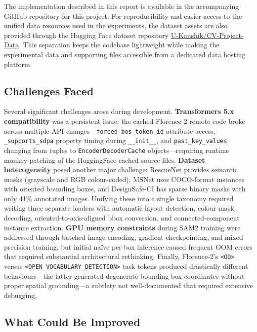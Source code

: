 \documentclass[10pt,a4paper,twocolumn]{article}
\begin{document}
The implementation described in this report is available in the accompanying GitHub repository for this project. For reproducibility and easier access to the unified data resources used in the experiments, the dataset assets are also provided through the Hugging Face dataset repository \href{https://huggingface.co/datasets/U-Kaushik/CV-Project-Data}{U-Kaushik/CV-Project-Data}. This separation keeps the codebase lightweight while making the experimental data and supporting files accessible from a dedicated data hosting platform.

\subsection{Challenges Faced}

Several significant challenges arose during development. \textbf{Transformers 5.x compatibility} was a persistent issue: the cached Florence-2 remote code broke across multiple API changes---\texttt{forced\_bos\_token\_id} attribute access, \texttt{\_supports\_sdpa} property timing during \texttt{\_\_init\_\_}, and \texttt{past\_key\_values} changing from tuples to \texttt{EncoderDecoderCache} objects---requiring runtime monkey-patching of the HuggingFace-cached source files. \textbf{Dataset heterogeneity} posed another major challenge: RescueNet provides semantic masks (grayscale and RGB colour-coded), MSNet uses COCO-format instances with oriented bounding boxes, and DesignSafe-CI has sparse binary masks with only 41\% annotated images. Unifying these into a single taxonomy required writing three separate loaders with automatic layout detection, colour-mask decoding, oriented-to-axis-aligned bbox conversion, and connected-component instance extraction. \textbf{GPU memory constraints} during SAM2 training were addressed through batched image encoding, gradient checkpointing, and mixed-precision training, but initial na\"ive per-box inference caused frequent OOM errors that required substantial architectural rethinking. Finally, Florence-2's \texttt{<OD>} versus \texttt{<OPEN\_VOCABULARY\_DETECTION>} task tokens produced drastically different behaviours---the latter generated degenerate bounding box coordinates without proper spatial grounding---a subtlety not well-documented that required extensive debugging.

\subsection{What Could Be Improved}
\end{document}
